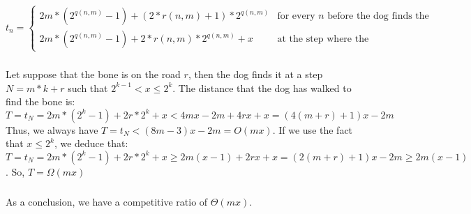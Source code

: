 $t_n = \begin{cases}
2m*(2^{q(n,m)}-1) + (2*r(n,m)+1)*2^{q(n,m)} & \mbox{for every } n \mbox{ before the dog finds the bone}
\\ 2m*(2^{q(n,m)}-1) + 2*r(n,m)*2^{q(n,m)}+ x & \mbox{at the step where the dog finds the bone}
\end{cases}$
\subparagraph{}
Let suppose that the bone is on the road $r$, then the dog finds it at a step $N=m*k+r$ such that $2^{k-1}<x\leq 2^k$.
\newline
The distance that the dog has walked to find the bone is:
\newline
$T=t_N= 2m*(2^k-1) + 2r*2^{k}+ x<4mx - 2m +4rx +x=(4(m+r)+1)x-2m$
\newline
Thus, we always have $T=t_N<(8m-3)x-2m=O(mx)$.
\newline
\newline
If we use the fact that $x\leq 2^k$, we deduce that:
\newline
$T=t_N= 2m*(2^k-1) + 2r*2^{k}+ x \geq 2m(x-1)+2rx +x = (2(m+r)+1)x -2m \geq 2m(x-1)$.
So, $T=\Omega(mx)$
\subparagraph{}
As a conclusion, we have a competitive ratio of $\Theta(mx)$.